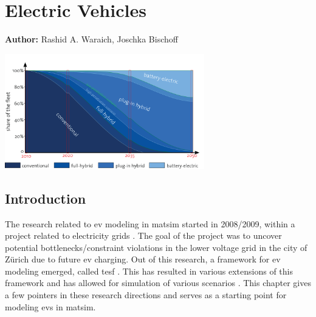\chapter{Electric Vehicles}
\label{ch:elvehicles}

\hfill \textbf{Author:} Rashid A. Waraich, Joschka Bischoff

\begin{center} \includegraphics[width=0.65\textwidth, angle=0]{extending/figures/Elvehicles/main.png} \end{center}

\section{Introduction}
The research related to \gls{ev} modeling in \gls{matsim} started in 2008/2009, within a project related to electricity grids \citep[][]{WaraichEtAl_IATBR_2009, WaraichEtAl_TRR_2013}. The goal of the project was to uncover potential bottlenecks/constraint violations in the lower voltage grid in the city of Zürich due to future \gls{ev} charging. Out of this research, a framework for \gls{ev} modeling emerged, called \gls{tesf} \citep[][]{WaraichEtAl_JanssensEtAl_2014}. This has resulted in various extensions of this framework and has allowed for simulation of various scenarios \citep[][]{WaraichEtAl_JanssensEtAl_2014, Waraich_PhDThesis_2014, AbedinWaraich_JSDEWES_2014, Schieffer_MastersThesis_2011, GalusAndersson_CIGRE_2011, GalusEtAl_ResRep_EWZ_2012, Bischoff2013MaTaxis, BischoffMaciejewskiEcabMielecMobilTUM}. This chapter gives a few pointers in these research directions and serves as a starting point for modeling \glspl{ev} in \gls{matsim}.

